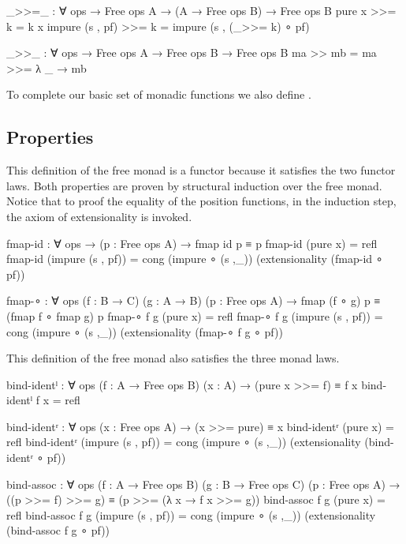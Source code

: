 \begin{code}
_>>=_ : ∀ {ops} → Free ops A → (A → Free ops B) → Free ops B
pure x           >>= k = k x
impure (s , pf)  >>= k = impure (s , (_>>= k) ∘ pf)

_>>_ : ∀ {ops} → Free ops A → Free ops B → Free ops B
ma >> mb = ma >>= λ _ → mb
\end{code}
To complete our basic set of monadic functions we also define .


\subsection{Properties}

This definition of the free monad is a functor because it satisfies the two
functor laws.
Both properties are proven by structural induction over the free monad.
Notice that to proof the equality of the position functions, in the induction
step, the axiom of extensionality is invoked.

\begin{code}[number=fmap-id]
fmap-id : ∀ {ops} → (p : Free ops A) → fmap id p ≡ p
fmap-id (pure x)           = refl
fmap-id (impure (s , pf))  = cong (impure ∘ (s ,_)) (extensionality (fmap-id ∘ pf))
\end{code}
\begin{code}[number=fmap-comp]
fmap-∘ : ∀ {ops} (f : B → C) (g : A → B) (p : Free ops A) →
         fmap (f ∘ g) p ≡ (fmap f ∘ fmap g) p
fmap-∘ f g (pure x)           = refl
fmap-∘ f g (impure (s , pf))  = cong (impure ∘ (s ,_)) (extensionality (fmap-∘ f g ∘ pf))
\end{code}
This definition of the free monad also satisfies the three monad laws.

\begin{code}[number=bind-ident-left]
bind-identˡ : ∀ {ops} (f : A → Free ops B) (x : A) → (pure x >>= f) ≡ f x
bind-identˡ f x = refl
\end{code}
\begin{code}[number=bind-ident-right]
bind-identʳ : ∀ {ops} (x : Free ops A) → (x >>= pure) ≡ x
bind-identʳ (pure x)           = refl
bind-identʳ (impure (s , pf))  = cong (impure ∘ (s ,_)) (extensionality (bind-identʳ ∘ pf))
\end{code}
\begin{code}[number=bind-assoc]
bind-assoc : ∀ {ops} (f : A → Free ops B) (g : B → Free ops C) (p : Free ops A) →
             ((p >>= f) >>= g) ≡ (p >>= (λ x → f x >>= g))
bind-assoc f g (pure x)           = refl
bind-assoc f g (impure (s , pf))  = cong (impure ∘ (s ,_)) (extensionality (bind-assoc f g ∘ pf))
\end{code}

